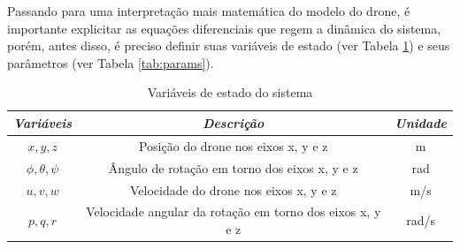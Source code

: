 Passando para uma interpretação mais matemática do modelo do drone, é importante explicitar as equações diferenciais 
que regem a dinâmica do sistema, porém, antes disso, é preciso definir suas variáveis de estado (ver Tabela \ref{tab:vars}) 
e seus parâmetros (ver Tabela \ref{tab:params}).
\vspace{-0.2cm}
\begin{table}[h!]
    \centering
    \caption{Variáveis de estado do sistema}
    \begin{tabular}{|c|c|c|}
        \hline
        \emph{Variáveis} & \emph{Descrição} & \emph{Unidade} \\ \hline
        ${x, y, z}$& Posição do drone nos eixos x, y e z & m \\ \hline
        ${\phi, \theta, \psi}$& Ângulo de rotação em torno dos eixos x, y e z & rad \\ \hline
        ${u, v, w}$& Velocidade do drone nos eixos x, y e z & m/s \\ \hline
        ${p, q, r}$& Velocidade angular da rotação em torno dos eixos x, y e z & rad/s \\ \hline
    \end{tabular}
    \label{tab:vars}
\end{table}

\vspace{-1cm}

